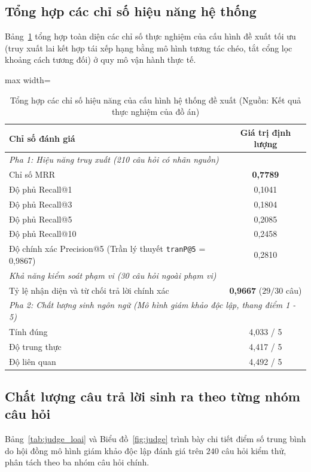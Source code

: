 \subsection{Tổng hợp các chỉ số hiệu năng hệ thống}
Bảng~\ref{tab:summary} tổng hợp toàn diện các chỉ số thực nghiệm của cấu hình đề xuất tối ưu (truy xuất lai kết hợp tái xếp hạng bằng mô hình tương tác chéo, tắt cổng lọc khoảng cách tương đối) ở quy mô vận hành thực tế.

\begin{table}[H]
\centering
\caption{Tổng hợp các chỉ số hiệu năng của cấu hình hệ thống đề xuất (Nguồn: Kết quả thực nghiệm của đồ án)}
\label{tab:summary}
\small
\begin{adjustbox}{max width=\textwidth}
\begin{tabular}{lc}
\toprule
\textbf{Chỉ số đánh giá} & \textbf{Giá trị định lượng} \\
\midrule
\multicolumn{2}{l}{\textit{Pha 1: Hiệu năng truy xuất (210 câu hỏi có nhãn nguồn)}} \\
Chỉ số MRR & \textbf{0,7789} \\
Độ phủ Recall@1 & 0,1041 \\
Độ phủ Recall@3 & 0,1804 \\
Độ phủ Recall@5 & 0,2085 \\
Độ phủ Recall@10 & 0,2458 \\
Độ chính xác Precision@5 (Trần lý thuyết \texttt{tranP@5} = 0,9867) & 0,2810 \\
\midrule
\multicolumn{2}{l}{\textit{Khả năng kiểm soát phạm vi (30 câu hỏi ngoài phạm vi)}} \\
Tỷ lệ nhận diện và từ chối trả lời chính xác & \textbf{0,9667} ($29/30$ câu) \\
\midrule
\multicolumn{2}{l}{\textit{Pha 2: Chất lượng sinh ngôn ngữ (Mô hình giám khảo độc lập, thang điểm 1 - 5)}} \\
Tính đúng & 4,033 / 5 \\
Độ trung thực & 4,417 / 5 \\
Độ liên quan & 4,492 / 5 \\
\bottomrule
\end{tabular}
\end{adjustbox}
\end{table}

\subsection{Chất lượng câu trả lời sinh ra theo từng nhóm câu hỏi}
\label{sec:judge_loai}
Bảng~\ref{tab:judge_loai} và Biểu đồ~\ref{fig:judge} trình bày chi tiết điểm số trung bình do hội đồng mô hình giám khảo độc lập đánh giá trên $240$ câu hỏi kiểm thử, phân tách theo ba nhóm câu hỏi chính.

